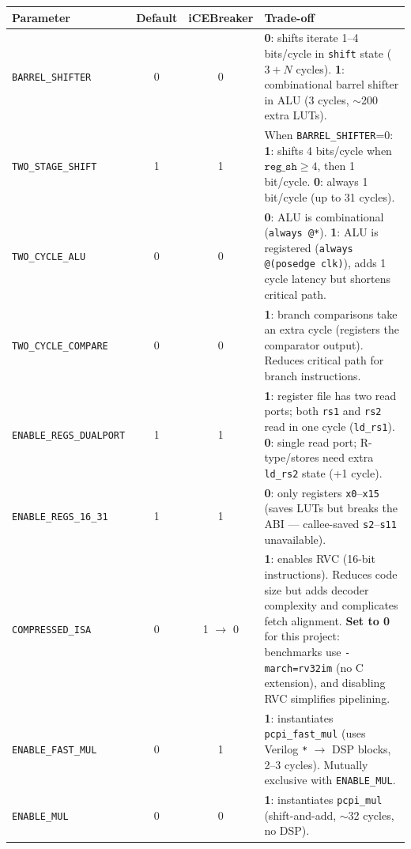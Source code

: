 \documentclass[9pt, a4paper]{extarticle}
\begin{document}
\begin{table}[htbp]
\centering\scriptsize
\renewcommand{\arraystretch}{1.25}
\begin{tabular}{@{}l c c p{7.5cm}@{}}
    \toprule
    Parameter & Default & iCEBreaker & Trade-off \\
    \midrule
    \texttt{BARREL\_SHIFTER} & 0 & 0 &
        \textbf{0}: shifts iterate 1--4 bits/cycle in \texttt{shift} state ($3{+}N$ cycles). \textbf{1}: combinational barrel shifter in ALU (3 cycles, $\sim$200 extra LUTs). \\
    \texttt{TWO\_STAGE\_SHIFT} & 1 & 1 &
        When \texttt{BARREL\_SHIFTER}=0: \textbf{1}: shifts 4 bits/cycle when $\texttt{reg\_sh} \geq 4$, then 1 bit/cycle. \textbf{0}: always 1 bit/cycle (up to 31 cycles). \\
    \texttt{TWO\_CYCLE\_ALU} & 0 & 0 &
        \textbf{0}: ALU is combinational (\texttt{always @*}). \textbf{1}: ALU is registered (\texttt{always @(posedge clk)}), adds 1 cycle latency but shortens critical path. \\
    \texttt{TWO\_CYCLE\_COMPARE} & 0 & 0 &
        \textbf{1}: branch comparisons take an extra cycle (registers the comparator output). Reduces critical path for branch instructions. \\
    \texttt{ENABLE\_REGS\_DUALPORT} & 1 & 1 &
        \textbf{1}: register file has two read ports; both \texttt{rs1} and \texttt{rs2} read in one cycle (\texttt{ld\_rs1}). \textbf{0}: single read port; R-type/stores need extra \texttt{ld\_rs2} state (+1 cycle). \\
    \texttt{ENABLE\_REGS\_16\_31} & 1 & 1 &
        \textbf{0}: only registers \texttt{x0}--\texttt{x15} (saves LUTs but breaks the ABI --- callee-saved \texttt{s2}--\texttt{s11} unavailable). \\
    \texttt{COMPRESSED\_ISA} & 0 & 1 $\to$ 0 &
        \textbf{1}: enables RVC (16-bit instructions). Reduces code size but adds decoder complexity and complicates fetch alignment. \textbf{Set to 0} for this project: benchmarks use \texttt{-march=rv32im} (no C extension), and disabling RVC simplifies pipelining. \\
    \texttt{ENABLE\_FAST\_MUL} & 0 & 1 &
        \textbf{1}: instantiates \texttt{pcpi\_fast\_mul} (uses Verilog \texttt{*} $\to$ DSP blocks, 2--3 cycles). Mutually exclusive with \texttt{ENABLE\_MUL}. \\
    \texttt{ENABLE\_MUL} & 0 & 0 &
        \textbf{1}: instantiates \texttt{pcpi\_mul} (shift-and-add, $\sim$32 cycles, no DSP). \\

\end{tabular}
\end{table}
\end{document}

